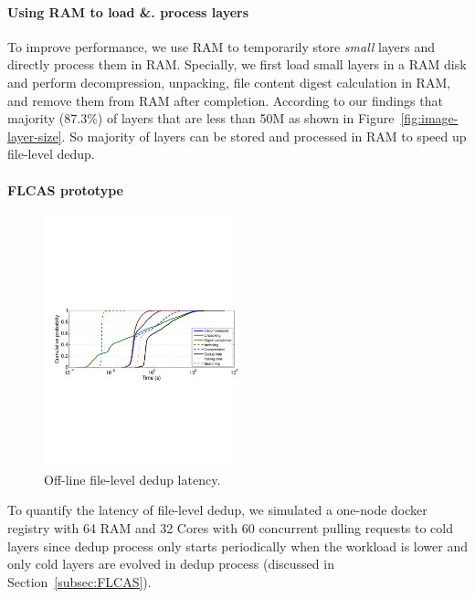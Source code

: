 \paragraph{Using RAM to load \&. process layers}

To improve performance, we use RAM to temporarily store \textit{small} layers and directly process them in RAM.
Specially, we first load small layers in a RAM disk and perform decompression, unpacking, file content digest calculation in RAM, and remove them from RAM after completion.   
According to our findings that majority (87.3\%) of layers that are less than 50M as shown in Figure~\ref{fig:image-layer-size}. So majority of layers can be stored and processed in RAM to speed up file-level dedup. 

\paragraph{FLCAS prototype}

\begin{figure}
	\centering
	\includegraphics[width=0.5\textwidth]{graphs/res-time.pdf}
	\caption{Off-line file-level dedup latency.
	}
	\label{fig:dedup-res}
\end{figure}

To quantify the latency of file-level dedup, we simulated a one-node docker registry with 64 RAM and 32 Cores with 60 concurrent pulling requests to cold layers since dedup process only starts periodically when the workload is lower and only cold layers are evolved in dedup process (discussed in Section~\ref{subsec:FLCAS}).

